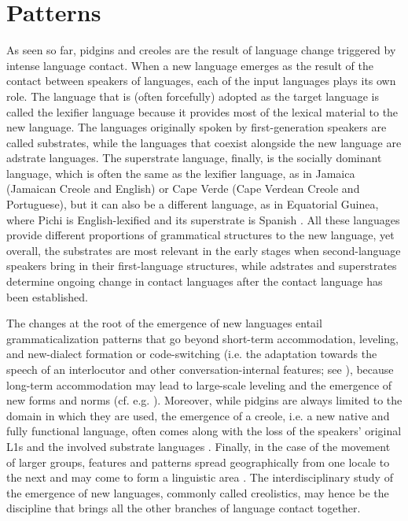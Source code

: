 \documentclass[output=paper,
modfonts
]{langscibook}
\begin{document}
\section{Patterns} \label{patterns}

As seen so far, pidgins and creoles are the result of language change triggered by intense language contact. When a new language emerges as the result of the contact between speakers of languages, each of the input languages plays its own role. The language that is (often forcefully) adopted as the target language is called the lexifier language because it provides most of the lexical material to the new language. The languages originally spoken by first-generation speakers are called substrates, while the languages that coexist alongside the new language are adstrate languages. The superstrate language, finally, is the socially dominant language, which is often the same as the lexifier language, as in Jamaica (Jamaican Creole and English) or Cape Verde (Cape Verdean Creole and Portuguese), but it can also be a different language, as in Equatorial Guinea, where Pichi is English-lexified and its superstrate is Spanish \citep[cf.][]{yakpo2017towards}. All these languages provide different proportions of grammatical structures to the new language, yet overall, the substrates are most relevant in the early stages when second-language speakers bring in their first-language structures, while adstrates and superstrates determine ongoing change in contact languages after the contact language has been established.

The changes at the root of the emergence of new languages entail grammaticalization patterns that go beyond short-term accommodation, leveling, and new-dialect formation or code-switching (i.e. the adaptation towards the speech of an interlocutor and other conversation-internal features; see \citealt{ruchetal_tv}), because long-term accommodation may lead to large-scale leveling and the emergence of new forms and norms (cf. e.g. \citealt{kerswill2010contact}). Moreover, while pidgins are always limited to the domain in which they are used, the emergence of a creole, i.e. a new native and fully functional language, often comes along with the loss of the speakers' original L1s and the involved substrate languages \parencite[see]{karnopp_tv}. Finally, in the case of the movement of larger groups, features and patterns spread geographically from one locale to the next and may come to form a linguistic area \parencite[see]{gijnetal_tv}.
The interdisciplinary study of the emergence of new languages, commonly called creolistics, may hence be the discipline that brings all the other branches of language contact together.
\end{document}
